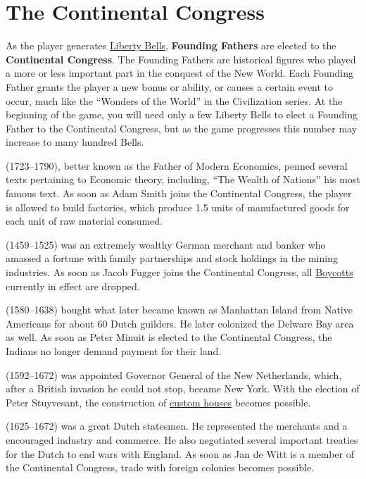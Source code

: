 \documentclass[12pt]{book}
\begin{document}
\hypertarget{Continental Congress}{\chapter{The Continental Congress}}

As the player generates \hyperlink{Liberty Bells}{Liberty Bells},
\hypertarget{Founding Fathers}{\textbf{Founding Fathers}} are elected
to the {\textbf{Continental Congress}}. The Founding Fathers are
historical figures who played a more or less important part in the
conquest of the New World. Each Founding Father grants the player a
new bonus or ability, or causes a certain event to occur, much like
the ``Wonders of the World'' in the Civilization series. At the
beginning of the game, you will need only a few Liberty Bells to elect
a Founding Father to the Continental Congress, but as the game
progresses this number may increase to many hundred Bells.

 (1723--1790), better known as the Father of Modern
Economics, penned several texts pertaining to Economic theory,
including, ``The Wealth of Nations'' his most famous text. As soon as
Adam Smith joins the Continental Congress, the player is allowed to
build factories, which produce 1.5 units of manufactured goods for
each unit of raw material consumed. 

 (1459--1525) was an extremely wealthy German
merchant and banker who amassed a fortune with family partnerships and
stock holdings in the mining industries. As soon as Jacob Fugger joins
the Continental Congress, all \hyperlink{Boycotts}{Boycotts} currently
in effect are dropped. 

 (1580--1638) bought what later became known as
Manhattan Island from Native Americans for about 60 Dutch guilders. He
later colonized the Delware Bay area as well. As soon as Peter Minuit
is elected to the Continental Congress, the Indians no longer demand
payment for their land. 

 (1592--1672) was appointed Governor General
of the New Netherlands, which, after a British invasion he could not
stop, became New York. With the election of Peter Stuyvesant, the
construction of \hyperlink{Custom House}{custom houses} becomes
possible. 

 (1625--1672) was a great Dutch statesmen.  He
represented the merchants and a encouraged industry and commerce. He
also negotiated several important treaties for the Dutch to end wars
with England. As soon as Jan de Witt is a member of the Continental
Congress, trade with foreign colonies becomes possible.
\end{document}

